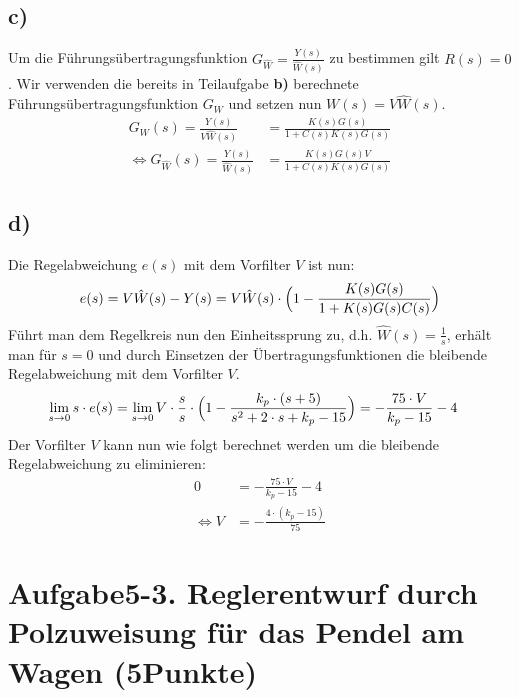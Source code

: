 \documentclass[11pt]{scrartcl} %
\begin{document}
\subsection*{c)}
Um die Führungsübertragungsfunktion $G_{\hat{W}}=\frac{Y(s)}{\hat{W}(s)}$ zu bestimmen gilt $R(s)=0$. Wir verwenden die bereits in Teilaufgabe \textbf{b)} berechnete Führungsübertragungsfunktion $G_W$ und setzen nun $W(s)=V\hat{W}(s)$.
\begin{align*}
	G_{W}(s)=\frac{Y(s)}{V\hat{W}(s)}&=\frac{K(s)G(s)}{1+C(s)K(s)G(s)}\\
	\Leftrightarrow G_{\hat{W}}(s)=\frac{Y(s)}{\hat{W}(s)}&=\frac{K(s)G(s)V}{1+C(s)K(s)G(s)}
\end{align*}
\subsection*{d)}
Die Regelabweichung $e(s)$ mit dem Vorfilter $V$ ist nun:
\begin{align*}
	e(s)=V\hat{W}(s)-Y(s)=V\hat{W}(s)\cdot\Bigl(1-\frac{K(s)G(s)}{1+K(s)G(s)C(s)}\Bigl)
\end{align*}
Führt man dem Regelkreis nun den Einheitssprung zu, d.h. $\hat{W}(s)=\frac{1}{s}$, erhält man für $s=0$ und durch Einsetzen der Übertragungsfunktionen die bleibende Regelabweichung mit dem Vorfilter $V$.
\begin{align*}
	\lim \limits_{s \to 0}s\cdot e(s)&=\lim \limits_{s \to 0}V\cdot\frac{s}{s}\cdot\Bigl(1-\frac{k_p\cdot(s+5)}{s^2+2\cdot s+k_p-15}\Bigr)=-\frac{75\cdot V}{k_p-15}-4
\end{align*}
Der Vorfilter $V$ kann nun wie folgt berechnet werden um die bleibende Regelabweichung zu eliminieren:
\begin{align*}
	0&=-\frac{75\cdot V}{k_p-15}-4\\
\Leftrightarrow V&=-\frac{4\cdot(k_p-15)}{75}
\end{align*}



\section*{Aufgabe5-3. Reglerentwurf durch Polzuweisung für das Pendel am Wagen (5Punkte)}
\end{document}
